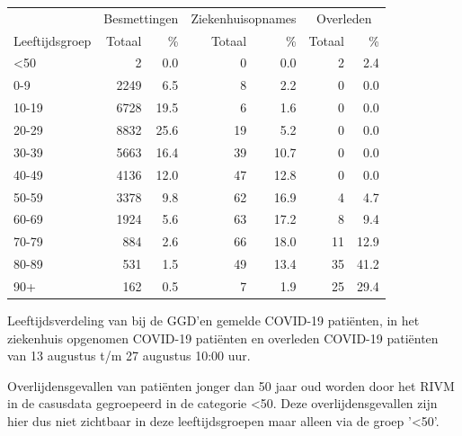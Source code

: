 \documentclass[
  english,
  man,floatsintext]{apa6}
\begin{document}
\begin{table}
\centering\begingroup\fontsize{11}{13}\selectfont

\begin{threeparttable}
\begin{tabular}{lrrrrrr}
\toprule
\multicolumn{1}{c}{ } & \multicolumn{2}{c}{Besmettingen} & \multicolumn{2}{c}{Ziekenhuisopnames} & \multicolumn{2}{c}{Overleden} \\
\cmidrule(l{3pt}r{3pt}){2-3} \cmidrule(l{3pt}r{3pt}){4-5} \cmidrule(l{3pt}r{3pt}){6-7}
Leeftijdsgroep & Totaal & \% & Totaal & \% & Totaal & \%\\
\midrule
<50 & 2 & 0.0 & 0 & 0.0 & 2 & 2.4\\
0-9 & 2249 & 6.5 & 8 & 2.2 & 0 & 0.0\\
10-19 & 6728 & 19.5 & 6 & 1.6 & 0 & 0.0\\
20-29 & 8832 & 25.6 & 19 & 5.2 & 0 & 0.0\\
30-39 & 5663 & 16.4 & 39 & 10.7 & 0 & 0.0\\
40-49 & 4136 & 12.0 & 47 & 12.8 & 0 & 0.0\\
50-59 & 3378 & 9.8 & 62 & 16.9 & 4 & 4.7\\
60-69 & 1924 & 5.6 & 63 & 17.2 & 8 & 9.4\\
70-79 & 884 & 2.6 & 66 & 18.0 & 11 & 12.9\\
80-89 & 531 & 1.5 & 49 & 13.4 & 35 & 41.2\\
90+ & 162 & 0.5 & 7 & 1.9 & 25 & 29.4\\
\bottomrule
\end{tabular}
\begin{tablenotes}
\item[1] Leeftijdsverdeling van bij de GGD’en gemelde COVID-19 patiënten, in het ziekenhuis opgenomen COVID-19 patiënten en overleden COVID-19 patiënten van 13 augustus t/m 27 augustus 10:00 uur.
\item[2] Overlijdensgevallen van patiënten jonger dan 50 jaar oud worden door het RIVM in de casusdata gegroepeerd in de categorie <50. Deze overlijdensgevallen zijn hier dus niet zichtbaar in deze leeftijdsgroepen maar alleen via de groep '<50'.
\end{tablenotes}
\end{threeparttable}
\endgroup{}
\end{table}

\newpage
\end{document}
